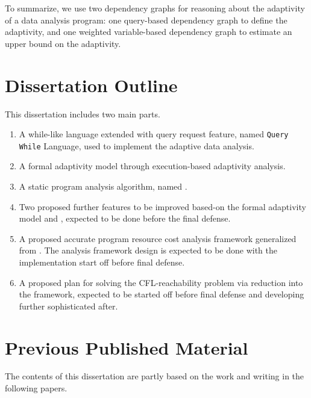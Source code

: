 {To summarize, we use two dependency graphs for reasoning about the adaptivity of a data analysis program: 
one query-based dependency graph to define the adaptivity, and one weighted variable-based dependency graph to estimate an upper bound on the adaptivity. }



\section{Dissertation Outline}
This dissertation includes two main parts. 
\begin{enumerate}
\item A while-like language extended with query request feature, named {\tt Query While} Language, 
used to implement 
the adaptive data analysis.
\item A formal adaptivity model through execution-based adaptivity analysis.
\item A static program analysis algorithm, named {\THESYSTEM}.
\item Two proposed further features to be improved based-on the formal adaptivity model and {\THESYSTEM},
 expected to be done before the final defense.
\item A proposed accurate program resource cost analysis framework generalized from {\THESYSTEM}. 
The analysis framework design is expected to be done with the implementation start off before final defense.
\item A proposed plan for solving the CFL-reachability problem via reduction into the {\THESYSTEM} framework,
expected to be started off before final defense and developing further sophisticated after.
\end{enumerate}



\section{Previous Published Material}
The contents of this dissertation are partly based on the work and writing in the following papers.



